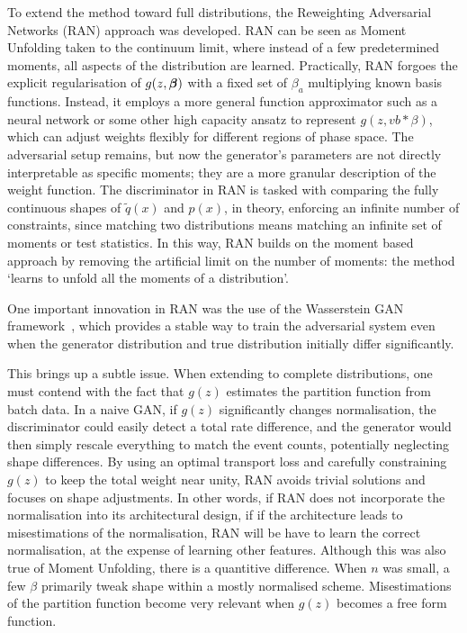 {{        To extend the method toward full distributions, the Reweighting Adversarial Networks (RAN) approach was developed.
        RAN can be seen as Moment Unfolding taken to the continuum limit, where instead of a few predetermined moments, all aspects of the distribution are learned.
        Practically, RAN forgoes the explicit regularisation of $g(z, \vb*\beta)$ with a fixed set of $\beta_a$ multiplying known basis functions.
        Instead, it employs a more general function approximator such as a neural network or some other high capacity ansatz to represent $g(z, vb*\beta)$, which can adjust weights flexibly for different regions of phase space.
        The adversarial setup remains, but now the generator’s parameters are not directly interpretable as specific moments;
        they are a more granular description of the weight function.
        The discriminator in RAN is tasked with comparing the fully continuous shapes of $\tilde{q}(x)$ and $p(x)$, in theory, enforcing an infinite number of constraints, since matching two distributions means matching an infinite set of moments or test statistics.
        In this way, RAN builds on the moment based approach by removing the artificial limit on the number of moments: the method `learns to unfold all the moments of a distribution'.

        One important innovation in RAN was the use of the Wasserstein GAN framework~\cite{stephanovitch_optimal_2023}, which provides a stable way to train the adversarial system even when the generator distribution and true distribution initially differ significantly.

        This brings up a subtle issue.
        When extending to complete distributions, one must contend with the fact that $g(z)$ estimates the partition function from batch data.
        In a naive GAN, if $g(z)$ significantly changes normalisation, the discriminator could easily detect a total rate difference, and the generator would then simply rescale everything to match the event counts, potentially neglecting shape differences.
        By using an optimal transport loss and carefully constraining $g(z)$ to keep the total weight near unity, RAN avoids trivial solutions and focuses on shape adjustments.
        In other words, if RAN does not incorporate the normalisation into its architectural design, if if the architecture leads to misestimations of the normalisation, RAN will be have to learn the correct normalisation, at the expense of learning other features. 
        Although this was also true of Moment Unfolding, there is a quantitive difference.
        When $n$ was small, a few $\beta$ primarily tweak shape within a mostly normalised scheme.
        Misestimations of the partition function become very relevant when $g(z)$ becomes a free form function.

}}

